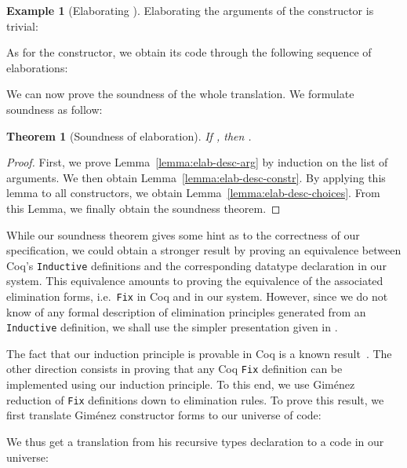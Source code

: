 \documentclass{scrartcl}
\theoremstyle{plain}
\newtheorem{theorem}{Theorem}
\theoremstyle{definition}
\newtheorem{example}{Example}
\newcommand{\ie}{i.e.\ }
\begin{document}
\begin{example}[Elaborating ]

Elaborating the arguments of the  constructor is trivial:

As for the  constructor, we obtain its code through the
following sequence of elaborations:


\end{example}





We can now prove the soundness of the whole translation. We
formulate soundness as follow:
\begin{theorem}[Soundness of elaboration]

If , 
then .

\end{theorem}
\begin{proof}

First, we prove Lemma~\ref{lemma:elab-desc-arg} by induction on the
list of arguments. We then obtain
Lemma~\ref{lemma:elab-desc-constr}. By applying this lemma to all
constructors, we obtain Lemma~\ref{lemma:elab-desc-choices}. From this
Lemma, we finally obtain the soundness theorem.

\end{proof}



While our soundness theorem gives some hint as to the correctness of
our specification, we could obtain a stronger result by proving an
equivalence between Coq's \texttt{Inductive} definitions and the
corresponding datatype declaration in our system. This equivalence
amounts to proving the equivalence of the associated elimination
forms, \ie \texttt{Fix} in Coq and  in our
system. However, since we do not know of any formal description of
elimination principles generated from an \texttt{Inductive}
definition, we shall use the simpler presentation given in
\citet{gimenez:coq-induction}.

\newcommand{\InterpretConstForm}[1]{\lfloor #1 \rfloor}

The fact that our induction principle is provable in Coq is a known
result~\citep{dagand:levitation}. The other direction consists in
proving that any Coq \texttt{Fix} definition can be implemented using
our induction principle. To this end, we use Gim\'{e}nez reduction of
\texttt{Fix} definitions down to elimination rules. To prove this
result, we first translate Gim\'{e}nez constructor forms to our
universe of code:

We thus get a translation from his recursive types declaration to a code in our
universe:
\end{document}

